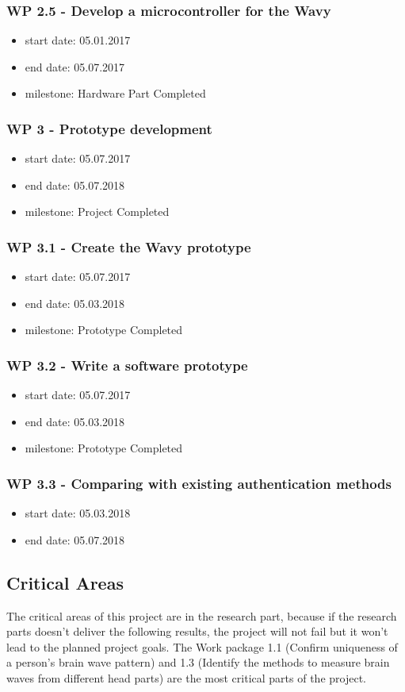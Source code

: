 \subsubsection{WP 2.5 - Develop a microcontroller for the Wavy}
\begin{itemize}
\item start date: 05.01.2017
\item end date: 05.07.2017
\item milestone: Hardware Part Completed
\end{itemize}
\subsubsection{WP 3 - Prototype development}
\begin{itemize}
\item start date: 05.07.2017
\item end date: 05.07.2018
\item milestone: Project Completed
\end{itemize}
\subsubsection{WP 3.1  - Create the Wavy prototype}
\begin{itemize}
\item start date: 05.07.2017
\item end date: 05.03.2018
\item milestone: Prototype Completed
\end{itemize}
\subsubsection{WP 3.2  - Write a software prototype}
\begin{itemize}
\item start date: 05.07.2017
\item end date: 05.03.2018
\item milestone: Prototype Completed
\end{itemize}
\subsubsection{WP 3.3  - Comparing with existing authentication methods}
\begin{itemize}
\item start date: 05.03.2018
\item end date:  05.07.2018
\end{itemize}

\subsection{Critical Areas}
The critical areas of this project are in the research part, because if the research parts doesn’t deliver the following results, the project will not fail but it won’t lead to the planned project goals. The Work package 1.1 (Confirm uniqueness of a person’s brain wave pattern) and 1.3 (Identify the methods to measure brain waves from different head parts) are the most critical parts of the project.





